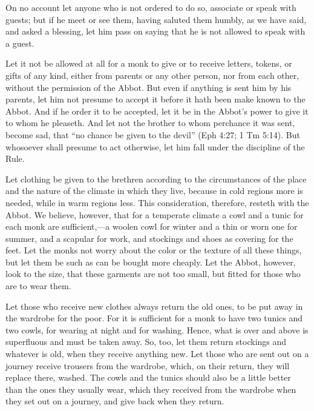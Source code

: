 On no account let anyone who is not ordered to do so, associate or speak with guests; but if he meet or see them, having saluted them humbly, as we have said, and asked a blessing, let him pass on saying that he is not allowed to speak with a guest.


Let it not be allowed at all for a monk to give or to receive letters, tokens, or gifts of any kind, either from parents or any other person, nor from each other, without the permission of the Abbot. But even if anything is sent him by his parents, let him not presume to accept it before it hath been make known to the Abbot. And if he order it to be accepted, let it be in the Abbot's power to give it to whom he pleaseth. And let not the brother to whom perchance it was sent, become sad, that ``no chance be given to the devil'' (Eph 4:27; 1 Tm 5:14). But whosoever shall presume to act otherwise, let him fall under the discipline of the Rule.


Let clothing be given to the brethren according to the circumstances of the place and the nature of the climate in which they live, because in cold regions more is needed, while in warm regions less. This consideration, therefore, resteth with the Abbot. We believe, however, that for a temperate climate a cowl and a tunic for each monk are sufficient,—a woolen cowl for winter and a thin or worn one for summer, and a scapular for work, and stockings and shoes as covering for the feet. Let the monks not worry about the color or the texture of all these things, but let them be such as can be bought more cheaply. Let the Abbot, however, look to the size, that these garments are not too small, but fitted for those who are to wear them.

Let those who receive new clothes always return the old ones, to be put away in the wardrobe for the poor. For it is sufficient for a monk to have two tunics and two cowls, for wearing at night and for washing. Hence, what is over and above is superfluous and must be taken away. So, too, let them return stockings and whatever is old, when they receive anything new. Let those who are sent out on a journey receive trousers from the wardrobe, which, on their return, they will replace there, washed. The cowls and the tunics should also be a little better than the ones they usually wear, which they received from the wardrobe when they set out on a journey, and give back when they return.

